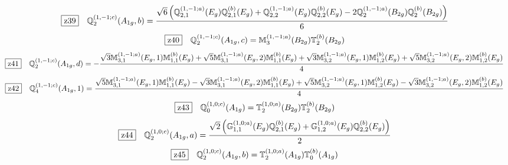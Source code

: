 \documentclass[fleqn,10pt,landscape]{jsarticle}
\begin{document}
\begin{dmath*}
\hspace*{3mm}\fbox{z39}\quad \mathbb{Q}_{2}^{(1,-1;c)}(A_{1g},b)=\frac{\sqrt{6} \left(\mathbb{Q}_{2,1}^{(1,-1;a)}(E_{g}) \mathbb{Q}_{2,1}^{(b)}(E_{g}) + \mathbb{Q}_{2,2}^{(1,-1;a)}(E_{g}) \mathbb{Q}_{2,2}^{(b)}(E_{g}) - 2 \mathbb{Q}_{2}^{(1,-1;a)}(B_{2g}) \mathbb{Q}_{2}^{(b)}(B_{2g})\right)}{6}
\end{dmath*}
\begin{dmath*}
\hspace*{3mm}\fbox{z40}\quad \mathbb{Q}_{2}^{(1,-1;c)}(A_{1g},c)=\mathbb{M}_{3}^{(1,-1;a)}(B_{2g}) \mathbb{T}_{2}^{(b)}(B_{2g})
\end{dmath*}
\begin{dmath*}
\hspace*{3mm}\fbox{z41}\quad \mathbb{Q}_{2}^{(1,-1;c)}(A_{1g},d)=- \frac{\sqrt{3} \mathbb{M}_{3,1}^{(1,-1;a)}(E_{g},1) \mathbb{M}_{1,1}^{(b)}(E_{g}) + \sqrt{5} \mathbb{M}_{3,1}^{(1,-1;a)}(E_{g},2) \mathbb{M}_{1,1}^{(b)}(E_{g}) + \sqrt{3} \mathbb{M}_{3,2}^{(1,-1;a)}(E_{g},1) \mathbb{M}_{1,2}^{(b)}(E_{g}) + \sqrt{5} \mathbb{M}_{3,2}^{(1,-1;a)}(E_{g},2) \mathbb{M}_{1,2}^{(b)}(E_{g})}{4}
\end{dmath*}
\begin{dmath*}
\hspace*{3mm}\fbox{z42}\quad \mathbb{Q}_{4}^{(1,-1;c)}(A_{1g},1)=\frac{\sqrt{5} \mathbb{M}_{3,1}^{(1,-1;a)}(E_{g},1) \mathbb{M}_{1,1}^{(b)}(E_{g}) - \sqrt{3} \mathbb{M}_{3,1}^{(1,-1;a)}(E_{g},2) \mathbb{M}_{1,1}^{(b)}(E_{g}) + \sqrt{5} \mathbb{M}_{3,2}^{(1,-1;a)}(E_{g},1) \mathbb{M}_{1,2}^{(b)}(E_{g}) - \sqrt{3} \mathbb{M}_{3,2}^{(1,-1;a)}(E_{g},2) \mathbb{M}_{1,2}^{(b)}(E_{g})}{4}
\end{dmath*}
\begin{dmath*}
\hspace*{3mm}\fbox{z43}\quad \mathbb{Q}_{0}^{(1,0;c)}(A_{1g})=\mathbb{T}_{2}^{(1,0;a)}(B_{2g}) \mathbb{T}_{2}^{(b)}(B_{2g})
\end{dmath*}
\begin{dmath*}
\hspace*{3mm}\fbox{z44}\quad \mathbb{Q}_{2}^{(1,0;c)}(A_{1g},a)=\frac{\sqrt{2} \left(\mathbb{G}_{1,1}^{(1,0;a)}(E_{g}) \mathbb{Q}_{2,1}^{(b)}(E_{g}) + \mathbb{G}_{1,2}^{(1,0;a)}(E_{g}) \mathbb{Q}_{2,2}^{(b)}(E_{g})\right)}{2}
\end{dmath*}
\begin{dmath*}
\hspace*{3mm}\fbox{z45}\quad \mathbb{Q}_{2}^{(1,0;c)}(A_{1g},b)=\mathbb{T}_{2}^{(1,0;a)}(A_{1g}) \mathbb{T}_{0}^{(b)}(A_{1g})
\end{dmath*}
\end{document}
